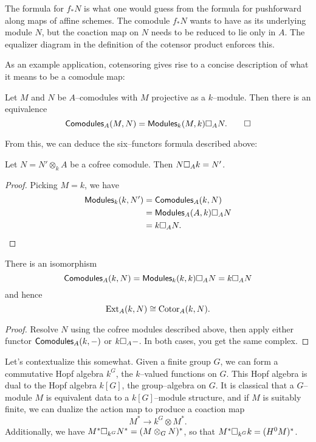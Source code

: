 \begin{remark}
The formula for $f_* N$ is what one would guess from the formula for pushforward along maps of affine schemes.  The comodule $f_* N$ wants to have as its underlying module $N$, but the coaction map on $N$ needs to be reduced to lie only in $A$.  The equalizer diagram in the definition of the cotensor product enforces this.
\end{remark}

\noindent As an example application, cotensoring gives rise to a concise description of what it means to be a comodule map:

\begin{lemma}
Let $M$ and $N$ be $A$--comodules with $M$ projective as a $k$--module.  Then there is an equivalence \[\mathsf{Comodules}_A(M, N) = \mathsf{Modules}_k(M, k) \square_A N. \qed\]
\end{lemma}

\noindent From this, we can deduce the six--functors formula described above:

\begin{corollary}
Let $N = N' \otimes_k A$ be a cofree comodule. Then $N \square_A k = N'$.
\end{corollary}
\begin{proof}
Picking $M = k$, we have
\begin{align*}
\mathsf{Modules}_k(k, N') & = \mathsf{Comodules}_A(k, N) \\
& = \mathsf{Modules}_A(A, k) \square_A N \\
& = k \square_A N. \qedhere
\end{align*}
\end{proof}

\begin{corollary}
There is an isomorphism \[\mathsf{Comodules}_A(k, N) = \mathsf{Modules}_k(k, k) \square_A N = k \square_A N\] and hence \[\operatorname{Ext}_A(k, N) \cong \operatorname{Cotor}_A(k, N).\]
\end{corollary}
\begin{proof}
Resolve $N$ using the cofree modules described above, then apply either functor $\mathsf{Comodules}_A(k, -)$ or $k \square_A -$.  In both cases, you get the same complex.
\end{proof}

\begin{example}\label{HopfAlgebrasFromFiniteGroups}
Let's contextualize this somewhat.  Given a finite group $G$, we can form a commutative Hopf algebra $k^G$, the $k$--valued functions on $G$.  This Hopf algebra is dual to the Hopf algebra $k[G]$, the group--algebra on $G$.  It is classical that a $G$--module $M$ is equivalent data to a $k[G]$--module structure, and if $M$ is suitably finite, we can dualize the action map to produce a coaction map \[M^* \to k^G \otimes M^*.\]  Additionally, we have $M^* \square_{k^G} N^* = (M \otimes_G N)^*$, so that $M^* \square_{k^G} k = (H^0 M)^*$.
\end{example}

